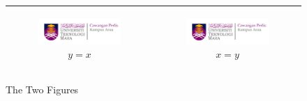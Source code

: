 \lipsum[2]

\begin{figure}[ht]
    \centering
    \begin{tabular}{|c|c|}
    \hline
     \begin{subfigure}[b]{0.44\textwidth}
         \centering
         \includegraphics[width=.8\linewidth]{mainmatter/images/logouitm.png}
         \caption{$y=x$}
         \label{fig:y_equals_x}
     \end{subfigure} &
     \begin{subfigure}[b]{0.44\textwidth}
         \centering
         \includegraphics[width=.8\linewidth]{mainmatter/images/logouitm.png}
         \caption{$x=y$}
         \label{fig:x_equals_y}
     \end{subfigure} \\
     \hline
    \end{tabular}
    \caption{The Two Figures}
    \label{fig:the2fig}
\end{figure}

\lipsum[1]

